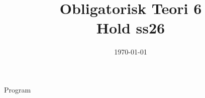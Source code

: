\documentclass[11pt,aspectratio=169]{beamer}
\title{Obligatorisk Teori 6\\
Hold ss26}
\date{\today}
\begin{document}
\begin{frame}
  \titlepage
\end{frame}

\begin{frame}{Program}
  \tableofcontents
\end{frame}












\end{document}
